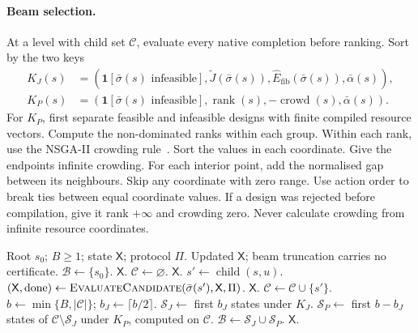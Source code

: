 \documentclass[a4paper,onecolumn,11pt,unpublished]{quantumarticle}
\theoremstyle{remark}
\begin{document}
\paragraph{Beam selection.}
At a level with child set $\mathcal C$, evaluate every native completion
before ranking.  Sort by the two keys
\begin{align}
K_J(s)&=(\mathbf1[\bar\sigma(s)\text{ infeasible}],
\widetilde J(\bar\sigma(s)),\widehat E_{\mathrm{fib}}(\bar\sigma(s)),\bar\alpha(s)),
\label{eq:app-beam-score-order}\\
K_P(s)&=(\mathbf1[\bar\sigma(s)\text{ infeasible}],
\operatorname{rank}(s),-\operatorname{crowd}(s),\bar\alpha(s)).
\label{eq:app-beam-pareto-order}
\end{align}
For $K_P$, first separate feasible and infeasible designs with finite compiled
resource vectors. Compute the non-dominated ranks within each group.
Within each rank, use the NSGA-II crowding rule~\cite{DebEtAl2002}.
Sort the values in each coordinate. Give the endpoints infinite crowding.
For each interior point, add the normalised gap between its neighbours.
Skip any coordinate with zero range. Use action order to break ties between
equal coordinate values. If a design was rejected before compilation, give
it rank $+\infty$ and crowding zero. Never calculate crowding from infinite
resource coordinates.

\begin{algorithm}[H]
\caption{Width-$B$ Pareto-beam search}
\label{alg:app-pareto-beam}
\begin{algorithmic}[1]
\Require Root $s_0$; $B\geq1$; state $\mathsf X$; protocol $\Pi$.
\Ensure Updated $\mathsf X$; beam truncation carries no certificate.
\State $\mathcal B\gets\{s_0\}$.
     \State \Return $\mathsf X$. \EndIf
    \State $\mathcal C\gets\varnothing$.
         \State \Return $\mathsf X$. \EndIf
        \State $s'\gets\operatorname{child}(s,u)$.
        \State $(\mathsf X,\mathrm{done})\gets
        \Call{EvaluateCandidate}{\bar\sigma(s'),\mathsf X,\Pi}$.
         \State \Return $\mathsf X$. \EndIf
        \State $\mathcal C\gets\mathcal C\cup\{s'\}$.
    \EndFor
    \State $b\gets\min\{B,|\mathcal C|\}$; $b_J\gets\lceil b/2\rceil$.
    \State $\mathcal S_J\gets$ first $b_J$ states under $K_J$.
    \State $\mathcal S_P\gets$ first $b-b_J$ states of
    $\mathcal C\setminus\mathcal S_J$ under $K_P$, computed on $\mathcal C$.
    \State $\mathcal B\gets\mathcal S_J\cup\mathcal S_P$.
\EndFor
\State \Return $\mathsf X$.
\end{algorithmic}
\end{algorithm}
\end{document}
